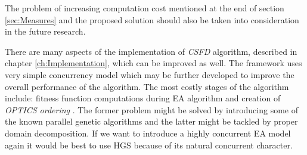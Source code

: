 The problem of increasing computation cost mentioned at the end of section
\ref{sec:Measures} and the proposed solution should also be taken into
consideration in the future research.

There are many aspects of the implementation of \textit{CSFD} algorithm,
described in chapter \ref{ch:Implementation}, which can be improved as well. The
framework uses very simple concurrency model which may be further developed to improve the overall performance of the algorithm.
The most costly stages of the algorithm include: fitness function computations
during EA algorithm and creation of \textit{OPTICS ordering} \cite{optics}.
The former problem might be solved by introducing some of the known
parallel genetic algorithms and the latter might be tackled by proper
domain decomposition. If we want to introduce a highly concurrent EA model
again it would be best to use HGS because of its natural concurrent character.
